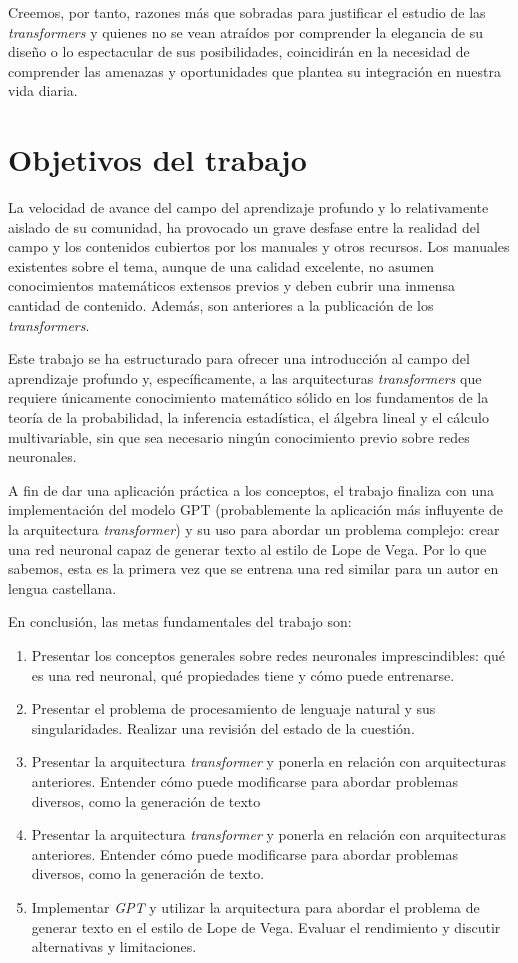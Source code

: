 Creemos, por tanto, razones más que sobradas para justificar el estudio de las \textit{transformers} y quienes no se vean atraídos por comprender la elegancia de su diseño o lo espectacular de sus posibilidades, coincidirán en la necesidad de comprender las amenazas y oportunidades que plantea su integración en nuestra vida diaria.

\section{Objetivos del trabajo}
La velocidad de avance del campo del aprendizaje profundo y lo relativamente aislado de su comunidad, ha provocado un grave desfase entre la realidad del campo y los contenidos cubiertos por los manuales y otros recursos. Los manuales existentes sobre el tema, aunque de una calidad excelente, no asumen conocimientos matemáticos extensos previos y deben cubrir una inmensa cantidad de contenido. Además, son anteriores a la publicación de los \textit{transformers}.

Este trabajo se ha estructurado para ofrecer una introducción al campo del aprendizaje profundo y, específicamente, a las arquitecturas \textit{transformers} que requiere únicamente conocimiento matemático sólido en los fundamentos de la teoría de la probabilidad, la inferencia estadística, el álgebra lineal y el cálculo multivariable, sin que sea necesario ningún conocimiento previo sobre redes neuronales.

A fin de dar una aplicación práctica a los conceptos, el trabajo finaliza con una implementación del modelo GPT (probablemente la aplicación más influyente de la arquitectura \textit{transformer}) y su uso para abordar un problema complejo: crear una red neuronal capaz de generar texto al estilo de Lope de Vega. Por lo que sabemos, esta es la primera vez que se entrena una red similar para un autor en lengua castellana.

En conclusión, las metas fundamentales del trabajo son:
\begin{enumerate}[label=(O\arabic*)]
    \setlength{\itemsep}{0pt}
    \setlength{\parskip}{0pt}
    \item Presentar los conceptos generales sobre redes neuronales imprescindibles: qué es una red neuronal, qué propiedades tiene y cómo puede entrenarse.
    \item Presentar el problema de procesamiento de lenguaje natural y sus singularidades. Realizar una revisión del estado de la cuestión.
    \item Presentar la arquitectura \textit{transformer} y ponerla en relación con arquitecturas anteriores. Entender cómo puede modificarse para abordar problemas diversos, como la generación de texto
    \item Presentar la arquitectura \textit{transformer} y ponerla en relación con arquitecturas anteriores. Entender cómo puede modificarse para abordar problemas diversos, como la generación de texto.
    \item Implementar \textit{GPT} y utilizar la arquitectura para abordar el problema de generar texto en el estilo de Lope de Vega. Evaluar el rendimiento y discutir alternativas y limitaciones.
\end{enumerate}

